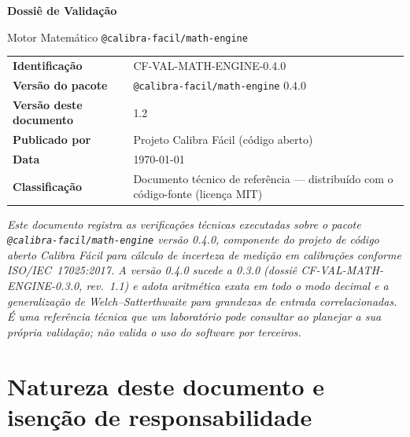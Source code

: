 \documentclass[11pt,a4paper]{article}
\makeatletter
\newcommand{\docTitle}{Dossiê de Validação}
\newcommand{\docSubject}{Motor Matemático \texttt{@calibra-facil/math-engine}}
\newcommand{\docVersion}{0.4.0}
\newcommand{\docRevision}{1.2}
\newcommand{\docId}{CF-VAL-MATH-ENGINE-0.4.0}
\newcommand{\docDate}{\today}
\newcommand{\organizationName}{Projeto Calibra Fácil}
\newcommand{\previousVersion}{0.3.0}
\makeatother
\begin{document}
\begin{titlepage}
  \begin{center}
    \vspace*{1.5cm}
    {\Huge\bfseries \docTitle\par}
    \vspace{0.4cm}
    {\Large \docSubject\par}
    \vspace{2.5cm}
    \begin{tabularx}{0.85\textwidth}{l X}
      \toprule
      \textbf{Identificação} & \docId \\
      \textbf{Versão do pacote} & \texttt{@calibra-facil/math-engine} \docVersion \\
      \textbf{Versão deste documento} & \docRevision{} \\
      \textbf{Publicado por} & \organizationName{} (código aberto) \\
      \textbf{Data} & \docDate \\
      \textbf{Classificação} & Documento técnico de referência --- distribuído com o código-fonte (licença MIT) \\
      \bottomrule
    \end{tabularx}
    \vfill
    \begin{minipage}{0.85\textwidth}
      \small\itshape
      Este documento registra as verificações técnicas executadas sobre o pacote \texttt{@calibra-facil/math-engine} versão \docVersion{}, componente do projeto de código aberto Calibra Fácil para cálculo de incerteza de medição em calibrações conforme \mbox{ISO/IEC 17025:2017}. A versão \docVersion{} sucede a \previousVersion{} (dossiê CF-VAL-MATH-ENGINE-0.3.0, rev.\ 1.1) e adota aritmética exata em todo o modo decimal e a generalização de Welch--Satterthwaite para grandezas de entrada correlacionadas. É uma referência técnica que um laboratório pode consultar ao planejar a sua própria validação; não valida o uso do software por terceiros.
    \end{minipage}
  \end{center}
\end{titlepage}

\section*{Natureza deste documento e isenção de responsabilidade}
\end{document}
